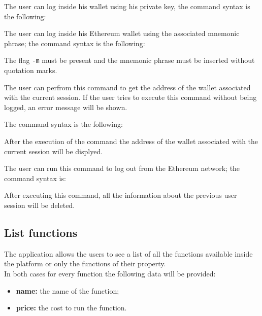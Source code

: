 The user can log inside his wallet using his private key, the command syntax is the following: \\
\begin{center}
\end{center}

The user can log inside his Ethereum wallet using the associated mnemonic phrase; the command syntax is the following:

\begin{center}
\end{center}
The flag \texttt{-m} must be present and the mnemonic phrase must be inserted without quotation marks.

The user can perfrom this command to get the address of the wallet associated with the current session. If the user tries to execute this command without being logged, an error message will be shown.

The command syntax is the following: \\
\begin{center}
\end{center}
After the execution of the command the address of the wallet associated with the current session will be displyed.

The user can run this command to log out from the Ethereum network; the command syntax is:
\begin{center}
\end{center}
After executing this command, all the information about the previous user session will be deleted.

\subsection{List functions}
The application allows the users to see a list of all the functions available inside the platform or only the functions of their property. \\
\noindent In both cases for every function the following data will be provided:
\begin{itemize}
	\item \textbf{name: } the name of the function;
	\item \textbf{price: } the cost to run the function.
\end{itemize}

